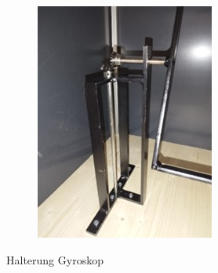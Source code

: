 \begin{figure}[H]
\begin{subfigure}[b]{0.4\textwidth}
        \label{fig:bild1}
    \end{subfigure}
    \hfill
    \begin{subfigure}[b]{0.4\textwidth}
        \centering
        \includegraphics[width=\textwidth]{image/gyroskop2.jpeg}
        
        \label{fig:bild2}
    \end{subfigure}
    \caption{Halterung Gyroskop}
    \label{fig:zwei_bilder}
\end{figure}
\vspace{3mm}

